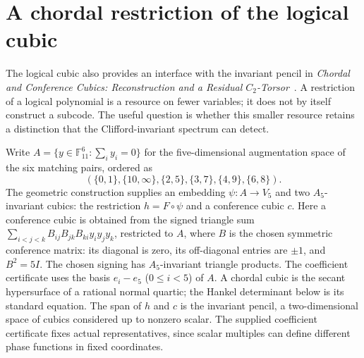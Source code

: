 \section{A chordal restriction of the logical cubic}\label{sec:shadow}
The logical cubic also provides an interface with the invariant pencil in
\emph{Chordal and Conference Cubics: Reconstruction and a Residual
$C_2$-Torsor}~\cite{shadowgeometry}. A restriction of a logical polynomial
is a resource on fewer variables; it does not by itself construct a subcode.
The useful question is whether this smaller resource retains a distinction
that the Clifford-invariant spectrum can detect.

Write $A=\{y\in\mathbb F_{11}^6:\sum_i y_i=0\}$ for the
five-dimensional augmentation space of the six matching pairs, ordered as
\[
 (\{0,1\},\{10,\infty\},\{2,5\},\{3,7\},\{4,9\},\{6,8\}).
\]
The geometric
construction supplies an embedding $\psi:A\longrightarrow V_5$ and two
$A_5$-invariant cubics: the restriction $h=F\circ\psi$ and a conference
cubic $c$. Here a conference cubic is obtained from the signed triangle
sum $\sum_{i<j<k}B_{ij}B_{jk}B_{ki}y_i y_j y_k$, restricted to $A$,
where $B$ is the chosen symmetric conference matrix: its diagonal is zero,
its off-diagonal entries are $\pm1$, and $B^2=5I$.
The chosen signing has $A_5$-invariant triangle products.
The coefficient certificate uses the basis $e_i-e_5$ ($0\leq i<5$) of $A$.
A chordal cubic is the secant hypersurface of a rational normal quartic;
the Hankel determinant below is its standard equation.
The span of $h$ and $c$ is the invariant pencil, a two-dimensional space of cubics
considered up to nonzero scalar. The supplied coefficient certificate fixes
actual representatives, since scalar multiples can define different phase
functions in fixed coordinates.

